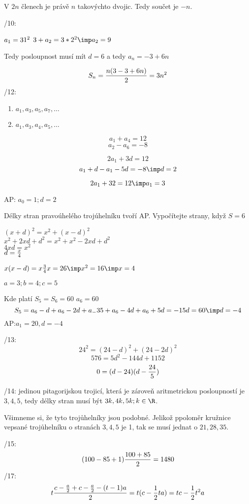 V $2n$ členech je právě $n$ takovýchto dvojic. Tedy součet je $-n$.

/10:

$a_1 = 3\*1^2$
$3+a_2 = 3*2^2 \imp a_2=9$

Tedy posloupnost musí mít $d=6$ a tedy $a_n=-3+6n$

$$S_n=\frac{n(3-3+6n)}2 = 3n^2$$
/12:
\begin{enumerate}
	\item $a_1,a_3,a_5,a_7,\dots$
	\item $a_1,a_3,a_4,a_5,\dots$
\end{enumerate}

\Pr
$$a_1+a_4 = 12 $$
$$a_2 - a_6 = -8$$

$$2a_1 + 3d = 12$$
$$a_1+d-a_1-5d = - 8 \imp d = 2$$

$$2a_1+3\*2 = 12 \imp a_1 = 3$$

AP: $a_0=1;d=2$

\Pr Délky stran pravoúhelého trojúhelníku  tvoří AP.
Vypočítejte strany, když $S=6$

$(x+d)^2 = x^2 + (x-d)^2$\\
$x^2+2xd+d^2 = x^2 + x^2 - 2xd + d^2$\\
$4xd = x^2$\\
$d = \frac x4$

$x(x-d) = x\f34 x = 2\*6\imp x^2 = 16 \imp x=4$

$a=3;b=4;c=5$

\Pr Kde platí $S_5=S_6 = 60$
$a_6 = 60$
$$S_5 = a_6-d+a_6-2d+a_-35+a_6-4d+a_6+5d = -15 d = 60 \imp d=-4$$
AP:$a_1=20,d=-4$

/13: 
$$24^2 = (24-d)^2 + (24-2d)^2$$
$$576 = 5 d^2 - 144 d + 1152$$
$$0 = (d-24) (d-\frac{24}5)$$

/14:
jedinou pitagorijskou trojicí, která je zároveň aritmetrickou posloupností je $3,4,5$,
tedy délky stran  musí být $3k,4k,5k;k\in\R$.

Všimneme si, že tyto trojůhelníky jsou podobné. Jelikož ppoloměr kružnice vepsané trojůhelníku o stranách $3,4,5$ je 1, tak se musí jednat o 
$21,28,35$.

/15:
$$(100-85+1)\frac{100+85}{2} = 1480$$
/17:
$$ t \frac{c-\frac a 2 +c-\frac a 2 - (t-1)a}{2} = t(c-\frac 12 ta) = tc-\frac 12t^2a$$



\EndDoc
